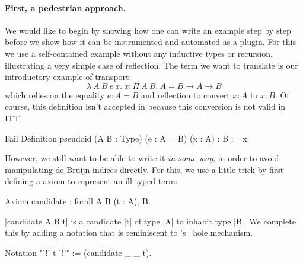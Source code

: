 \paragraph{First, a pedestrian approach.}
%
We would like to begin by showing how one can write an example step by step
before we show how it can be instrumented and automated as a plugin.
For this we use a self-contained example without any inductive
types or recursion, illustrating a very simple case of reflection.
The term we want to translate is our introductory example of transport:
\[
  \lambda\ A\ B\ e\ x.\ x : \Pi\ A\ B.\ A = B \to
  A \to B
\]
which relies on the equality $e : A = B$ and reflection to convert $x
: A$ to $x : B$.
%
Of course, this definition isn't accepted in \Coq because this
conversion is not valid in ITT.
%
\begin{coq}
Fail Definition pseudoid (A B : Type) (e : A = B) (x : A) : B := x.
\end{coq}
%
However, we still want to be able to write it \emph{in some way}, in order to
avoid manipulating de Bruijn indices directly.
For this, we use a little trick by first defining a \Coq axiom to represent
an ill-typed term:
%
\begin{coq}
Axiom candidate : forall A B (t : A), B.
\end{coq}
%
\coqe|candidate A B t| is a candidate \coqe|t| of type
\coqe|A| to inhabit type \coqe|B|.
We complete this by adding a notation that is reminiscent to
\Agda's~\cite{norell2007towards} hole mechanism.
%
\begin{coq}
Notation "'{!' t '!}'" := (candidate _ _ t).
\end{coq}

